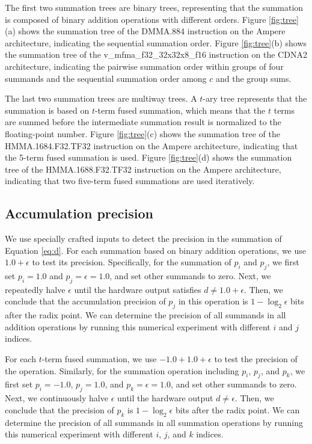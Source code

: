 The first two summation trees are binary trees, representing that the summation is composed of binary addition operations with different orders. Figure \ref{fig:tree}(a) shows the summation tree of the DMMA.884 instruction on the Ampere architecture, indicating the sequential summation order. Figure \ref{fig:tree}(b) shows the summation tree of the v\_mfma\_f32\_32x32x8\_f16 instruction on the CDNA2 architecture, indicating the pairwise summation order within groups of four summands and the sequential summation order among $c$ and the group sums. 

The last two summation trees are multiway trees. A $t$-ary tree represents that the summation is based on $t$-term fused summation, which means that the $t$ terms are summed before the intermediate summation result is normalized to the floating-point number. Figure \ref{fig:tree}(c) shows the summation tree of the HMMA.1684.F32.TF32 instruction on the Ampere architecture, indicating that the 5-term fused summation is used. Figure \ref{fig:tree}(d) shows the summation tree of the HMMA.1688.F32.TF32 instruction on the Ampere architecture, indicating that two five-term fused summations are used iteratively.

\subsection{Accumulation precision}

We use specially crafted inputs to detect the precision in the summation of Equation \ref{eq:d}. For each summation based on binary addition operations, we use $1.0 + \epsilon$ to test its precision. Specifically, for the summation of $p_i$ and $p_j$, we first set $p_i=1.0$ and $p_j=\epsilon=1.0$, and set other summands to zero. Next, we repeatedly halve $\epsilon$ until the hardware output satisfies $d\neq 1.0+\epsilon$. Then, we conclude that the accumulation precision of $p_j$ in this operation is $1-\log_2 \epsilon$ bits after the radix point. We can determine the precision of all summands in all addition operations by running this numerical experiment with different $i$ and $j$ indices.

For each $t$-term fused summation, we use $-1.0+1.0+\epsilon$ to test the precision of the operation. Similarly, for the summation operation including $p_i$, $p_j$, and $p_k$, we first set $p_i=-1.0$, $p_j=1.0$, and $p_k=\epsilon=1.0$, and set other summands to zero. Next, we continuously halve $\epsilon$ until the hardware output $d\neq \epsilon$. Then, we conclude that the precision of $p_k$ is $1-\log_2 \epsilon$ bits after the radix point. We can determine the precision of all summands in all summation operations by running this numerical experiment with different $i$, $j$, and $k$ indices.

